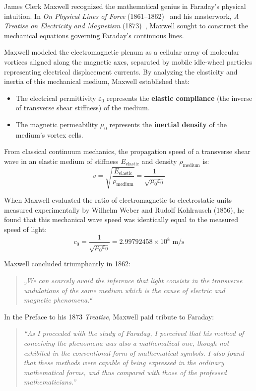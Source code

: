 \documentclass[11pt,a4paper]{article}
\begin{document}
James Clerk Maxwell recognized the mathematical genius in Faraday's physical intuition. In \textit{On Physical Lines of Force} (1861--1862)~\cite{Maxwell1861} and his masterwork, \textit{A Treatise on Electricity and Magnetism} (1873)~\cite{Maxwell1873}, Maxwell sought to construct the mechanical equations governing Faraday's continuous lines.

Maxwell modeled the electromagnetic plenum as a cellular array of molecular vortices aligned along the magnetic axes, separated by mobile idle-wheel particles representing electrical displacement currents. By analyzing the elasticity and inertia of this mechanical medium, Maxwell established that:
\begin{itemize}
    \item The electrical permittivity $\varepsilon_0$ represents the \textbf{elastic compliance} (the inverse of transverse shear stiffness) of the medium.
    \item The magnetic permeability $\mu_0$ represents the \textbf{inertial density} of the medium's vortex cells.
\end{itemize}

From classical continuum mechanics, the propagation speed of a transverse shear wave in an elastic medium of stiffness $E_{\text{elastic}}$ and density $\rho_{\text{medium}}$ is:
\begin{equation}
v = \sqrt{\frac{E_{\text{elastic}}}{\rho_{\text{medium}}}} = \frac{1}{\sqrt{\mu_0 \varepsilon_0}}
\end{equation}

When Maxwell evaluated the ratio of electromagnetic to electrostatic units measured experimentally by Wilhelm Weber and Rudolf Kohlrausch (1856), he found that this mechanical wave speed was identically equal to the measured speed of light:
\begin{equation}
c_0 = \frac{1}{\sqrt{\mu_0\varepsilon_0}} = 2.99792458 \times 10^8\text{ m/s}
\end{equation}

Maxwell concluded triumphantly in 1862:
\begin{quote}
\textit{„We can scarcely avoid the inference that light consists in the transverse undulations of the same medium which is the cause of electric and magnetic phenomena.“}
\end{quote}

In the Preface to his 1873 \textit{Treatise}, Maxwell paid tribute to Faraday:
\begin{quote}
\textit{``As I proceeded with the study of Faraday, I perceived that his method of conceiving the phenomena was also a mathematical one, though not exhibited in the conventional form of mathematical symbols. I also found that these methods were capable of being expressed in the ordinary mathematical forms, and thus compared with those of the professed mathematicians.''}
\end{quote}
\end{document}
